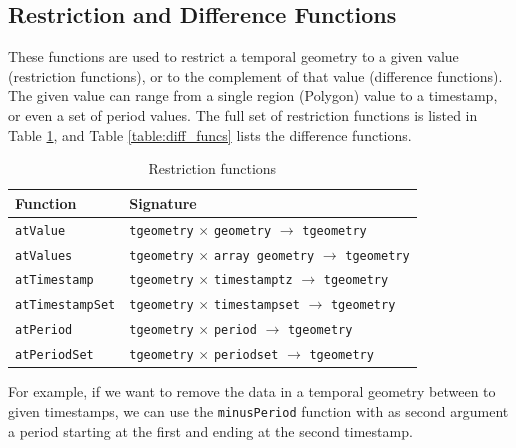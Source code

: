 \subsection{Restriction and Difference Functions}
\label{section:restriction_and_difference}

These functions are used to restrict a temporal geometry to a given value (restriction functions), or to the complement of that value (difference functions). The given value can range from a single region (Polygon) value to a timestamp, or even a set of period values. The full set of restriction functions is listed in Table \ref{table:restriction_funcs}, and Table \ref{table:diff_funcs} lists the difference functions.

\begin{table}[htb]
    \centering
    \begin{tabularx}{\textwidth}{|l|X|}
    \hline
    \textbf{Function}   & \textbf{Signature} \\ 
    \hline
    \lstinline+atValue+             & \lstinline+tgeometry+ $\times$ \lstinline+geometry+ $\rightarrow$ \lstinline+tgeometry+\\
    \hline
    \lstinline+atValues+            & \lstinline+tgeometry+ $\times$ \lstinline+array geometry+ $\rightarrow$ \lstinline+tgeometry+\\
    \hline
    \lstinline+atTimestamp+         & \lstinline+tgeometry+ $\times$ \lstinline+timestamptz+ $\rightarrow$ \lstinline+tgeometry+ \\
    \hline
    \lstinline+atTimestampSet+      & \lstinline+tgeometry+ $\times$ \lstinline+timestampset+ $\rightarrow$ \lstinline+tgeometry+ \\
    \hline
    \lstinline+atPeriod+            & \lstinline+tgeometry+ $\times$ \lstinline+period+ $\rightarrow$ \lstinline+tgeometry+ \\
    \hline
    \lstinline+atPeriodSet+         & \lstinline+tgeometry+ $\times$ \lstinline+periodset+ $\rightarrow$ \lstinline+tgeometry+ \\
    \hline
    \end{tabularx}
    \caption{Restriction functions}
    \label{table:restriction_funcs}
\end{table}

For example, if we want to remove the data in a temporal geometry between to given timestamps, we can use the \lstinline{minusPeriod} function with as second argument a period starting at the first and ending at the second timestamp.

